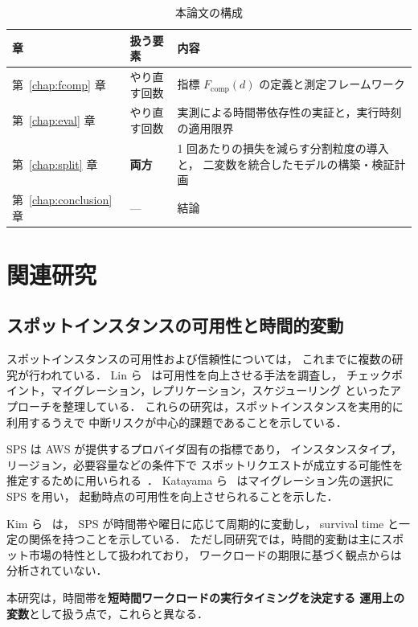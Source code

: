 \documentclass[11pt,a4paper]{ltjsreport}
\newcommand{\Fcomp}{F_{\mathrm{comp}}}
\begin{document}
\begin{table}[htbp]
\centering
\caption{本論文の構成}
\label{tab:structure}
\small
\begin{tabularx}{\textwidth}{@{}llX@{}}
\toprule
章 & 扱う要素 & 内容 \\
\midrule
第~\ref{chap:fcomp} 章 & やり直す回数
  & 指標 $\Fcomp(d)$ の定義と測定フレームワーク \\
第~\ref{chap:eval} 章 & やり直す回数
  & 実測による時間帯依存性の実証と，実行時刻の適用限界 \\
第~\ref{chap:split} 章 & \textbf{両方}
  & 1 回あたりの損失を減らす分割粒度の導入と，
    二変数を統合したモデルの構築・検証計画 \\
第~\ref{chap:conclusion} 章 & ---
  & 結論 \\
\bottomrule
\end{tabularx}
\end{table}

\chapter{関連研究}

\section{スポットインスタンスの可用性と時間的変動}

スポットインスタンスの可用性および信頼性については，
これまでに複数の研究が行われている．
Lin ら~\cite{Lin2022Survey} は可用性を向上させる手法を調査し，
チェックポイント，マイグレーション，レプリケーション，スケジューリング
といったアプローチを整理している．
これらの研究は，スポットインスタンスを実用的に利用するうえで
中断リスクが中心的課題であることを示している．

SPS は AWS が提供するプロバイダ固有の指標であり，
インスタンスタイプ，リージョン，必要容量などの条件下で
スポットリクエストが成立する可能性を推定するために用いられる~\cite{AWSSPS}．
Katayama ら~\cite{Katayama2022} はマイグレーション先の選択に SPS を用い，
起動時点の可用性を向上させられることを示した．

Kim ら~\cite{Kim2024SpotInterruption} は，
SPS が時間帯や曜日に応じて周期的に変動し，
survival time と一定の関係を持つことを示している．
ただし同研究では，時間的変動は主にスポット市場の特性として扱われており，
ワークロードの期限に基づく観点からは分析されていない．

本研究は，時間帯を\textbf{短時間ワークロードの実行タイミングを決定する
運用上の変数}として扱う点で，これらと異なる．
\end{document}
